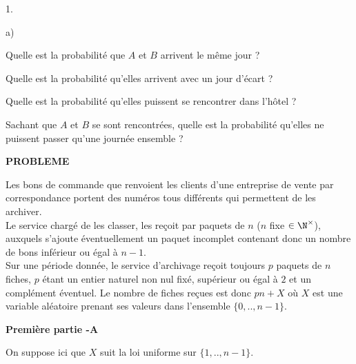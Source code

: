 \documentclass[11pt]{article}%
\begin{document}
\begin{noliste}{1.}
 \setlength{\itemsep}{4mm}
\item 

\begin{noliste}{a)}
 \setlength{\itemsep}{2mm}
\item Quelle est la probabilité que $A$ et $B$ arrivent le même jour ?

\item Quelle est la probabilité qu'elles arrivent avec un jour d'écart
?

\item Quelle est la probabilité qu'elles puissent se rencontrer dans
l'hôtel
 ?
\end{noliste}

\item Sachant que $A$ et $B$ se sont rencontrées, quelle est la
probabilité
qu'elles ne puissent passer qu'une journée ensemble ?
\end{noliste}

\begin{center}
\textbf{PROBLEME}
\end{center}

\noindent Les bons de commande que renvoient les clients d'une
entreprise de
vente par correspondance portent des numéros tous différents qui
permettent
de les archiver.\\
Le service chargé de les classer, les reçoit par paquets de $n$ ($n$
fixe $\in \N^{\times }$), auxquels s'ajoute éventuellement un paquet
incomplet contenant donc un nombre de bons inférieur ou égal à $n-1.$\\
Sur une période donnée, le service d'archivage reçoit toujours $p$
paquets
de $n$ fiches, $p$ étant un entier naturel non nul fixé, supérieur ou
égal à 
$2$ et un complément éventuel. Le nombre de fiches reçues est donc $pn
+ X$ où 
$X$ est une variable aléatoire prenant ses valeurs dans l'ensemble
$\{0,..,n-1\}.$

\begin{center}
\textbf{Première partie -A }
\end{center}

\noindent On suppose ici que $X$ suit la loi uniforme sur
$\{1,..,n-1\}.$
\end{document}
